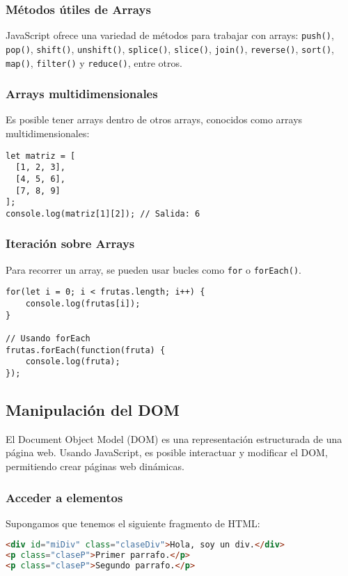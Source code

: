 \documentclass[executivepaper]{article}
\begin{document}
\subsubsection*{Métodos útiles de Arrays}
JavaScript ofrece una variedad de métodos para trabajar con arrays: \texttt{push()}, \texttt{pop()}, \texttt{shift()}, \texttt{unshift()}, \texttt{splice()}, \texttt{slice()}, \texttt{join()}, \texttt{reverse()}, \texttt{sort()}, \texttt{map()}, \texttt{filter()} y \texttt{reduce()}, entre otros.

\subsubsection*{Arrays multidimensionales}
Es posible tener arrays dentro de otros arrays, conocidos como arrays multidimensionales:
\begin{lstlisting}
let matriz = [
  [1, 2, 3],
  [4, 5, 6],
  [7, 8, 9]
];
console.log(matriz[1][2]); // Salida: 6
\end{lstlisting}

\subsubsection*{Iteración sobre Arrays}
Para recorrer un array, se pueden usar bucles como \texttt{for} o \texttt{forEach()}.
\begin{lstlisting}
for(let i = 0; i < frutas.length; i++) {
    console.log(frutas[i]);
}

// Usando forEach
frutas.forEach(function(fruta) {
    console.log(fruta);
});
\end{lstlisting}

\subsection{Manipulación del DOM}

El Document Object Model (DOM) es una representación estructurada de una página web. Usando JavaScript, es posible interactuar y modificar el DOM, permitiendo crear páginas web dinámicas.

\subsubsection*{Acceder a elementos}

Supongamos que tenemos el siguiente fragmento de HTML:
\begin{lstlisting}[language=HTML]
<div id="miDiv" class="claseDiv">Hola, soy un div.</div>
<p class="claseP">Primer parrafo.</p>
<p class="claseP">Segundo parrafo.</p>
\end{lstlisting}
\end{document}
